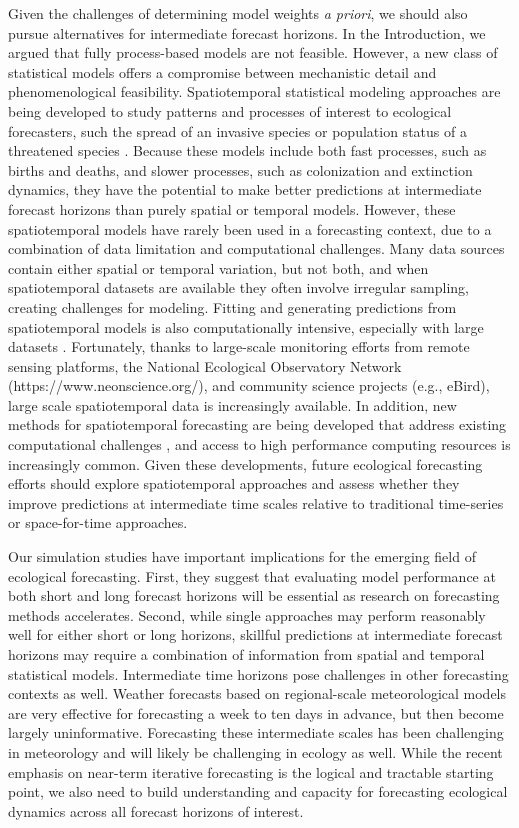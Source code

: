 \documentclass[11pt]{article}
\begin{document}
Given the challenges of determining model weights \emph{a priori}, we should also pursue alternatives for intermediate forecast horizons. In the Introduction, we argued that fully process-based models are not feasible. However, a new class of statistical models offers a compromise between mechanistic detail and phenomenological feasibility. Spatiotemporal statistical modeling approaches are being developed to study patterns and processes of interest to ecological forecasters, such the spread of an invasive species or population status of a threatened species  \citep{Wikle2003,Williams2017,Schliep2018}. Because these models include both fast processes, such as births and deaths, and slower processes, such as colonization and extinction dynamics, they have the potential to make better predictions at intermediate forecast horizons than purely spatial or temporal models. However, these spatiotemporal models have rarely been used in a forecasting context, due to a combination of data limitation and computational challenges. Many data sources contain either spatial or temporal variation, but not both, and when spatiotemporal datasets are available they often involve irregular sampling, creating challenges for modeling. Fitting and generating predictions from spatiotemporal models is also computationally intensive, especially with large datasets \citep{McDermott2017}. Fortunately, thanks to large-scale monitoring efforts from remote sensing platforms, the National Ecological Observatory Network (https://www.neonscience.org/), and community science projects (e.g., eBird), large scale spatiotemporal data is increasingly available. In addition, new methods for spatiotemporal forecasting are being developed that address existing computational challenges \citep{McDermott2017}, and access to high performance computing resources is increasingly common. Given these developments, future ecological forecasting efforts should explore spatiotemporal approaches and assess whether they improve predictions at intermediate time scales relative to traditional time-series or space-for-time approaches.

Our simulation studies have important implications for the emerging field of ecological forecasting. First, they suggest that evaluating model performance at both short and long forecast horizons will be essential as research on forecasting methods accelerates. Second, while single approaches may perform reasonably well for either short or long horizons, skillful predictions at intermediate forecast horizons may require a combination of information from spatial and temporal statistical models. Intermediate time horizons pose challenges in other forecasting contexts as well. Weather forecasts based on regional-scale meteorological models are very effective for forecasting a week to ten days in advance, but then become largely uninformative. Forecasting these intermediate scales has been challenging in meteorology and will likely be challenging in ecology as well. While the recent emphasis on near-term iterative forecasting \citep{dietze_iterative_2018} is the logical and tractable starting point, we also need to build understanding and capacity for forecasting ecological dynamics across all forecast horizons of interest.
\end{document}
